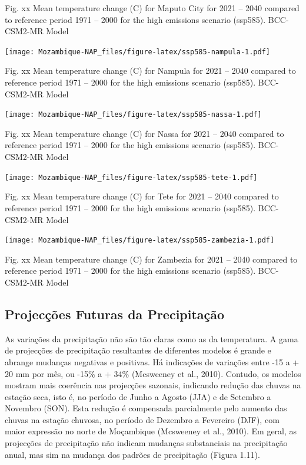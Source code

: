 \documentclass[
]{book}
\begin{document}
Fig. xx Mean temperature change (C) for Maputo City for 2021 -- 2040 compared to reference period 1971 -- 2000 for the high emissions scenario (ssp585). BCC-CSM2-MR Model

\texttt{[image: Mozambique-NAP\_files/figure-latex/ssp585-nampula-1.pdf]}

Fig. xx Mean temperature change (C) for Nampula for 2021 -- 2040 compared to reference period 1971 -- 2000 for the high emissions scenario (ssp585). BCC-CSM2-MR Model

\texttt{[image: Mozambique-NAP\_files/figure-latex/ssp585-nassa-1.pdf]}

Fig. xx Mean temperature change (C) for Nassa for 2021 -- 2040 compared to reference period 1971 -- 2000 for the high emissions scenario (ssp585). BCC-CSM2-MR Model

\texttt{[image: Mozambique-NAP\_files/figure-latex/ssp585-tete-1.pdf]}

Fig. xx Mean temperature change (C) for Tete for 2021 -- 2040 compared to reference period 1971 -- 2000 for the high emissions scenario (ssp585). BCC-CSM2-MR Model

\texttt{[image: Mozambique-NAP\_files/figure-latex/ssp585-zambezia-1.pdf]}

Fig. xx Mean temperature change (C) for Zambezia for 2021 -- 2040 compared to reference period 1971 -- 2000 for the high emissions scenario (ssp585). BCC-CSM2-MR Model

\hypertarget{projecuxe7uxf5es-futuras-da-precipitauxe7uxe3o}{%
\subsection{Projecções Futuras da Precipitação}\label{projecuxe7uxf5es-futuras-da-precipitauxe7uxe3o}}

As variações da precipitação não são tão claras como as da temperatura. A gama de projecções de precipitação resultantes de diferentes modelos é grande e abrange mudanças negativas e positivas. Há indicações de variações entre -15 a + 20 mm por mês, ou -15\% a + 34\% (Mcsweeney et al., 2010). Contudo, os modelos mostram mais coerência nas projecções sazonais, indicando redução das chuvas na estação seca, isto é, no período de Junho a Agosto (JJA) e de Setembro a Novembro (SON). Esta redução é compensada parcialmente pelo aumento das chuvas na estação chuvosa, no período de Dezembro a Fevereiro (DJF), com maior expressão no norte de Moçambique (Mcsweeney et al., 2010). Em geral, as projecções de precipitação não indicam mudanças substanciais na precipitação anual, mas sim na mudança dos padrões de precipitação (Figura 1.11).
\end{document}

